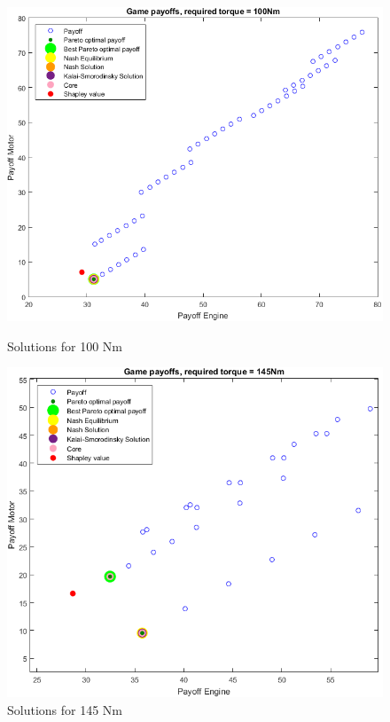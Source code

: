 \begin{figure}[h]
\centering
\begin{minipage}{.5\textwidth}
 	\centering
	\includegraphics[scale=0.395]{figures/gametheory/100nm}
	\caption{Solutions for 100 Nm}
	\label{fig:100nm}
\end{minipage}%
\begin{minipage}{.5\textwidth}
  	\centering
	\includegraphics[scale=0.39]{figures/gametheory/145nm}
  	\caption{Solutions for 145 Nm}
  	\label{fig:145nm}
\end{minipage}
\end{figure}

